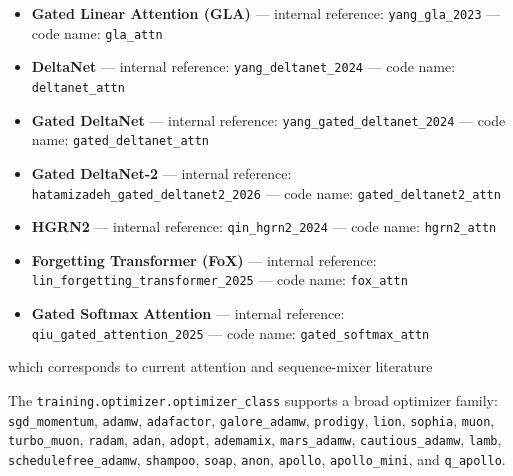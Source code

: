 \documentclass[11pt,a4paper]{article}
\begin{document}
\begin{itemize}[leftmargin=*]
    \item \textbf{Gated Linear Attention (GLA)} --- internal reference: \texttt{yang\_gla\_2023} --- code name: \texttt{gla\_attn}
    \item \textbf{DeltaNet} --- internal reference: \texttt{yang\_deltanet\_2024} --- code name: \texttt{deltanet\_attn}
    \item \textbf{Gated DeltaNet} --- internal reference: \texttt{yang\_gated\_deltanet\_2024} --- code name: \texttt{gated\_deltanet\_attn}
    \item \textbf{Gated DeltaNet-2} --- internal reference: \texttt{hatamizadeh\_gated\_deltanet2\_2026} --- code name: \texttt{gated\_deltanet2\_attn}
    \item \textbf{HGRN2} --- internal reference: \texttt{qin\_hgrn2\_2024} --- code name: \texttt{hgrn2\_attn}
    \item \textbf{Forgetting Transformer (FoX)} --- internal reference: \texttt{lin\_forgetting\_transformer\_2025} --- code name: \texttt{fox\_attn}
    \item \textbf{Gated Softmax Attention} --- internal reference: \texttt{qiu\_gated\_attention\_2025} --- code name: \texttt{gated\_softmax\_attn}
\end{itemize}

which corresponds to current attention and sequence-mixer literature \citep{sun_retentive_2023,gu_mamba_2023,zhang_continuous_2021,behrouz_titans_2025,ramapuram_theory_2024,vaswani_attention_2017,child_sparse_transformer_2019,beltagy_longformer_2020,zaheer_bigbird_2020,lou_sparsek_2024,yuan_nsa_2025,zhang_spargeattn_2025,wang_fasa_2026,yang_gla_2023,yang_deltanet_2024,yang_gated_deltanet_2024,hatamizadeh_gated_deltanet2_2026,qin_hgrn2_2024,lin_forgetting_transformer_2025,qiu_gated_attention_2025}

The \texttt{training.optimizer.optimizer\_class} supports a broad optimizer family:
\texttt{sgd\_momentum}, \texttt{adamw}, \texttt{adafactor}, \texttt{galore\_adamw}, \texttt{prodigy}, \texttt{lion}, \texttt{sophia}, \texttt{muon}, \texttt{turbo\_muon}, \texttt{radam}, \texttt{adan}, \texttt{adopt}, \texttt{ademamix}, \texttt{mars\_adamw}, \texttt{cautious\_adamw}, \texttt{lamb}, \texttt{schedulefree\_adamw}, \texttt{shampoo}, \texttt{soap}, \texttt{anon}, \texttt{apollo}, \texttt{apollo\_mini}, and \texttt{q\_apollo}.
\end{document}
